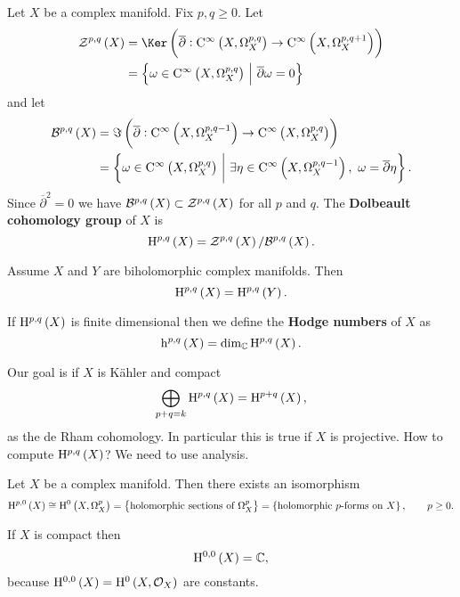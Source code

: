 Let $ X $ be a complex manifold. Fix $ p, q \ge 0 $. Let
\begin{align*}
\ZZZ^{p, q}\br{X}
& = \Ker \br{\overline{\partial} : \C^\infty\br{X, \Omega_X^{p, q}} \to \C^\infty\br{X, \Omega_X^{p, q + 1}}} \\
& = \cbr{\omega \in \C^\infty\br{X, \Omega_X^{p, q}} \st \overline{\partial}\omega = 0}
\end{align*}
and let
\begin{align*}
\BBB^{p, q}\br{X}
& = \Im \br{\overline{\partial} : \C^\infty\br{X, \Omega_X^{p, q - 1}} \to \C^\infty\br{X, \Omega_X^{p, q}}} \\
& = \cbr{\omega \in \C^\infty\br{X, \Omega_X^{p, q}} \st \exists \eta \in \C^\infty\br{X, \Omega_X^{p, q - 1}}, \ \omega = \overline{\partial}\eta}.
\end{align*}
Since $ \overline{\partial}^2 = 0 $ we have $ \BBB^{p, q}\br{X} \subset \ZZZ^{p, q}\br{X} $ for all $ p $ and $ q $. The \textbf{Dolbeault cohomology group} of $ X $ is
$$ \H^{p, q}\br{X} = \ZZZ^{p, q}\br{X} / \BBB^{p, q}\br{X}. $$

\pagebreak

\begin{exercise*}
Assume $ X $ and $ Y $ are biholomorphic complex manifolds. Then
$$ \H^{p, q}\br{X} = \H^{p, q}\br{Y}. $$
\end{exercise*}

If $ \H^{p, q}\br{X} $ is finite dimensional then we define the \textbf{Hodge numbers} of $ X $ as
$$ \h^{p, q}\br{X} = \dim_\CC \H^{p, q}\br{X}. $$


Our goal is if $ X $ is K\"ahler and compact
$$ \bigoplus_{p + q = k} \H^{p, q}\br{X} = \H^{p + q}\br{X}, $$
as the de Rham cohomology. In particular this is true if $ X $ is projective. How to compute $ \H^{p, q}\br{X} $? We need to use analysis.

\begin{proposition}
Let $ X $ be a complex manifold. Then there exists an isomorphism
$$ \H^{p, 0}\br{X} \cong \H^0\br{X, \Omega_X^p} = \cbr{\text{holomorphic sections of} \ \Omega_X^p} = \cbr{\text{holomorphic $ p $-forms on} \ X}, \qquad p \ge 0. $$
\end{proposition}

\begin{remark*}
If $ X $ is compact then
$$ \H^{0, 0}\br{X} = \CC, $$
because $ \H^{0, 0}\br{X} = \H^0\br{X, \OOO_X} $ are constants.
\end{remark*}

